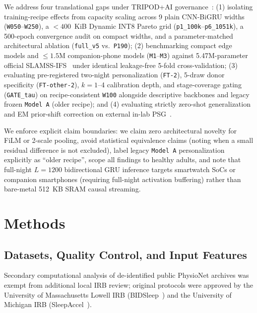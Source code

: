 \documentclass[journal]{IEEEtran}
\begin{document}
We address four translational gaps under TRIPOD+AI governance~\cite{collins2024tripod}: (1) isolating training-recipe effects from capacity scaling across 9 plain CNN-BiGRU widths (\texttt{W050}--\texttt{W250}), a $<400$~KiB Dynamic INT8 Pareto grid (\texttt{p1\_100k}--\texttt{p6\_1051k}), a 500-epoch convergence audit on compact widths, and a parameter-matched architectural ablation (\texttt{full\_v5} vs.\ \texttt{P190}); (2) benchmarking compact edge models and $\le 1.5$M companion-phone models (\texttt{M1}--\texttt{M3}) against 5.47M-parameter official SLAMSS-IFS~\cite{song2026bidsleep} under identical leakage-free 5-fold cross-validation; (3) evaluating pre-registered two-night personalization (\texttt{FT-2}), 5-draw donor specificity (\texttt{FT-other-2}), $k=1$--4 calibration depth, and stage-coverage gating (\texttt{GATE\_tau}) on recipe-consistent \texttt{W100} alongside descriptive backbones and legacy frozen \texttt{Model~A} (older recipe); and (4) evaluating strictly zero-shot generalization and EM prior-shift correction on external in-lab PSG~\cite{walch2019sleepaccel,walch2019sleepaccel_data}.

We enforce explicit claim boundaries: we claim zero architectural novelty for FiLM or 2-scale pooling, avoid statistical equivalence claims (noting when a small residual difference is not excluded), label legacy \texttt{Model~A} personalization explicitly as ``older recipe'', scope all findings to healthy adults, and note that full-night $L=1200$ bidirectional GRU inference targets smartwatch SoCs or companion smartphones (requiring full-night activation buffering) rather than bare-metal 512~KB SRAM causal streaming.

\section{Methods}
\subsection{Datasets, Quality Control, and Input Features}
Secondary computational analysis of de-identified public PhysioNet archives was exempt from additional local IRB review; original protocols were approved by the University of Massachusetts Lowell IRB (BIDSleep~\cite{song2026bidsleep,bidsleep_data}) and the University of Michigan IRB (SleepAccel~\cite{walch2019sleepaccel,walch2019sleepaccel_data}).
\end{document}
